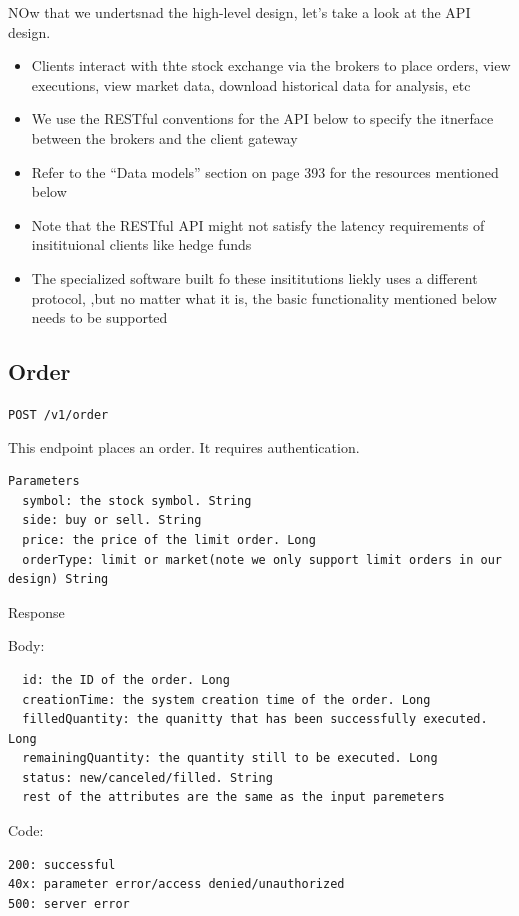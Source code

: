 \documentclass{report}
\theoremstyle{definition}
\let\oldsubsection\subsection
\renewcommand{\subsection}{\oldsubsection*}
\begin{document}
NOw that we undertsnad the high-level design, let's take a look at the API design.

\begin{itemize}
\item
Clients interact with thte stock exchange via the brokers to place orders, view executions, view market data, download historical data for analysis, etc
\item
We use the RESTful conventions for the API below to specify the itnerface between the brokers and the client gateway
\item
Refer to the ``Data models'' section on page 393 for the resources mentioned below
\item
Note that the RESTful API might not satisfy the latency requirements of insitituional clients like hedge funds
\item
The specialized software built fo these insititutions liekly uses a different protocol, ,but no matter what it is, the basic functionality mentioned below needs to be supported
\end{itemize}

\subsection{Order}

\lstinline|POST /v1/order|

This endpoint places an order. It requires authentication.

\begin{lstlisting}
Parameters
  symbol: the stock symbol. String
  side: buy or sell. String
  price: the price of the limit order. Long
  orderType: limit or market(note we only support limit orders in our design) String
\end{lstlisting}

Response

Body:

\begin{lstlisting}
  id: the ID of the order. Long
  creationTime: the system creation time of the order. Long
  filledQuantity: the quanitty that has been successfully executed. Long
  remainingQuantity: the quantity still to be executed. Long
  status: new/canceled/filled. String
  rest of the attributes are the same as the input paremeters
\end{lstlisting}

Code:

\begin{lstlisting}
200: successful
40x: parameter error/access denied/unauthorized
500: server error
\end{lstlisting}
\end{document}
